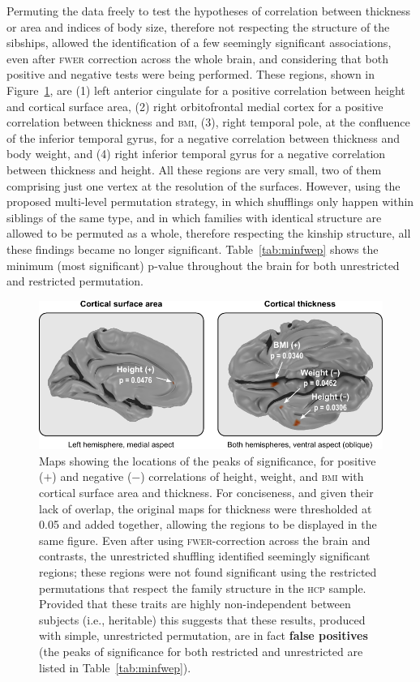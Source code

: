 Permuting the data freely to test the hypotheses of correlation between thickness or area and indices of body size, therefore not respecting the structure of the sibships, allowed the identification of a few seemingly significant associations, even after \textsc{fwer} correction across the whole brain, and considering that both positive and negative tests were being performed. These regions, shown in Figure~\ref{fig:realdata}, are (1) left anterior cingulate for a positive correlation between height and cortical surface area, (2) right orbitofrontal medial cortex for a positive correlation between thickness and \textsc{bmi}, (3), right temporal pole, at the confluence of the inferior temporal gyrus, for a negative correlation between thickness and body weight, and (4) right inferior temporal gyrus for a negative correlation between thickness and height. All these regions are very small, two of them comprising just one vertex at the resolution of the surfaces. However, using the proposed multi-level permutation strategy, in which shufflings only happen within siblings of the same type, and in which families with identical structure are allowed to be permuted as a whole, therefore respecting the kinship structure, all these findings became no longer significant. Table~\ref{tab:minfwep} shows the minimum (most significant) p-value throughout the brain for both unrestricted and restricted permutation.

\begin{figure}[!p]
\centering
\includegraphics{figures/realdata.pdf}
\caption[Maps showing significant correlations (false positives) of height, weight, and \textsc{bmi} with cortical surface area and thickness.]{Maps showing the locations of the peaks of significance, for positive ($+$) and negative ($-$) correlations of height, weight, and \textsc{bmi} with cortical surface area and thickness. For conciseness, and given their lack of overlap, the original maps for thickness were thresholded at 0.05 and added together, allowing the regions to be displayed in the same figure. Even after using \textsc{fwer}-correction across the brain and contrasts, the unrestricted shuffling identified seemingly significant regions; these regions were not found significant using the restricted permutations that respect the family structure in the \textsc{hcp} sample. Provided that these traits are highly non-independent between subjects (i.e., heritable) this suggests that these results, produced with simple, unrestricted permutation, are in fact \textbf{false positives} (the peaks of significance for both restricted and unrestricted are listed in Table~\ref{tab:minfwep}).}
\label{fig:realdata}
\end{figure}

